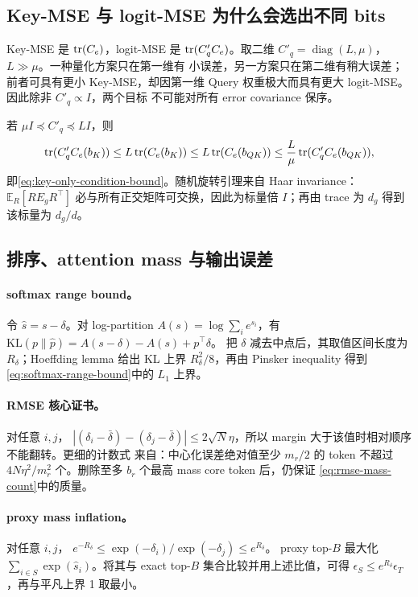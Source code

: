 \subsection{Key-MSE 与 logit-MSE 为什么会选出不同 bits}

Key-MSE 是 $\operatorname{tr}(C_e)$，logit-MSE 是 $\operatorname{tr}(C'_qC_e)$。取二维
$C'_q=\operatorname{diag}(L,\mu)$，$L\gg\mu$。一种量化方案只在第一维有
小误差，另一方案只在第二维有稍大误差；前者可具有更小 Key-MSE，却因第一维
Query 权重极大而具有更大 logit-MSE。因此除非 $C'_q\propto I$，两个目标
不可能对所有 error covariance 保序。

若 $\mu I\preceq C'_q\preceq LI$，则
\[
 \operatorname{tr}(C'_qC_e(b_K))\le L\operatorname{tr}(C_e(b_K))
 \le L\operatorname{tr}(C_e(b_{QK}))
 \le\frac L\mu\operatorname{tr}(C'_qC_e(b_{QK})),
\]
即\cref{eq:key-only-condition-bound}。随机旋转引理来自 Haar invariance：
$\mathbb E_R[RE_gR^\top]$ 必与所有正交矩阵可交换，因此为标量倍 $I$；再由
trace 为 $d_g$ 得到该标量为 $d_g/d$。

\subsection{排序、attention mass 与输出误差}

\paragraph{softmax range bound。}
令 $\widehat s=s-\delta$。对 log-partition
$A(s)=\log\sum_i e^{s_i}$，有
$\mathrm{KL}(p\|\widehat p)=
A(s-\delta)-A(s)+p^\top\delta$。
把 $\delta$ 减去中点后，其取值区间长度为 $R_\delta$；Hoeffding lemma
给出 KL 上界 $R_\delta^2/8$，再由 Pinsker inequality 得到
\cref{eq:softmax-range-bound}中的 $L_1$ 上界。

\paragraph{RMSE 核心证书。}
对任意 $i,j$，
$|(\delta_i-\bar\delta)-(\delta_j-\bar\delta)|
\le2\sqrt N\eta$，所以 margin 大于该值时相对顺序不能翻转。更细的计数式
来自：中心化误差绝对值至少 $m_r/2$ 的 token 不超过
$4N\eta^2/m_r^2$ 个。删除至多 $b_r$ 个最高 mass core token 后，仍保证
\cref{eq:rmse-mass-count}中的质量。

\paragraph{proxy mass inflation。}
对任意 $i,j$，
$e^{-R_\delta}\le
\exp(-\delta_i)/\exp(-\delta_j)\le e^{R_\delta}$。
proxy top-$B$ 最大化 $\sum_{i\in S}\exp(\widehat s_i)$。将其与 exact
top-$B$ 集合比较并用上述比值，可得
$\epsilon_S\le e^{R_\delta}\epsilon_T$，再与平凡上界 1 取最小。

